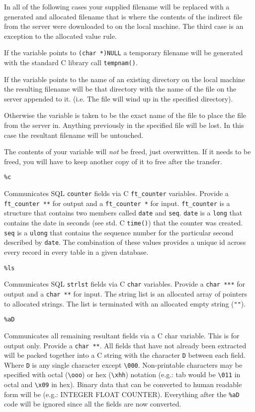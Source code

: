 In all of the following cases your supplied filename will be replaced
with a generated and allocated filename that is where the contents of
the indirect file from the server were downloaded to on the local
machine.  The third case is an exception to the allocated value rule.

If the variable points to \verb`(char *)NULL` a temporary filename will
be generated with the standard C library call \verb`tempnam()`.

If the variable points to the name of an existing directory on the local
machine the resulting filename will be that directory with the name of
the file on the server appended to it.  (i.e.  The file will wind up in
the specified directory).

Otherwise the variable is taken to be the exact name of the file to
place the file from the server in.  Anything previously in the specified
file will be lost.  In this case the resultant filename will be
untouched.

The contents of your variable will {\em not} be freed, just overwritten.  If
it needs to be freed, you will have to keep another copy of it to free
after the transfer.

\begin{verbatim}
%c
\end{verbatim}
Communicates SQL {\tt counter} fields via C {\tt ft\_counter} variables.  Provide a
\verb`ft_counter **` for output and a \verb`ft_counter *` for input.
\verb`ft_counter` is a structure that contains two members called
\verb`date` and \verb`seq`.  \verb`date` is a \verb`long` that contains
the date in seconds (see std.  C \verb`time()`) that the counter was
created.  \verb`seq` is a \verb`ulong` that contains the sequence number
for the particular second described by \verb`date`.  The combination of
these values provides a unique id across every record in every table in
a given database.

\begin{verbatim}
%ls
\end{verbatim}
Communicates SQL {\tt strlst} fields via C {\tt char} variables. Provide a
\verb`char ***` for output and a \verb`char **` for input. The
string list is an allocated array of pointers to allocated strings.
The list is terminated with an allocated empty string (\verb`""`).

\begin{verbatim}
%aD
\end{verbatim}
Communicates all remaining resultant fields via a C char variable.  This
is for output only.  Provide a \verb`char **`.  All fields that have not
already been extracted will be packed together into a C string with the
character \verb`D` between each field.  Where \verb`D` is any single
character except \verb`\000`.  Non-printable characters may be specified
with octal (\verb`\ooo`) or hex (\verb`\xhh`) notation (e.g.:  tab would
be \verb`\011` in octal and \verb`\x09` in hex).  Binary data that can
be converted to human readable form will be (e.g.:  INTEGER FLOAT
COUNTER).  Everything after the \verb`%aD` code will be ignored since
all the fields are now converted.

